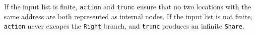 \documentclass[envcountsect]{llncs}
\begin{document}
If the input list is finite, {\tt action} and {\tt trunc} ensure that no two locations with the same address are both represented as internal nodes.
If the input list is not finite, {\tt action} never excapes the {\tt Right} branch, and {\tt trunc} produces an infinite {\tt Share}.

\begin{comment}
In the code above, the central detail is the function {\tt action}.
This function decom
Formally, Haskell datatypes are closer to coinductive types than inductive types, as the latter as forced to be 
To formalize and clarify the sharing, a cyclic Braun stream will be built with explicit sharing.
To ensure that the sharing is done correctly, we use {\tt iterate}.
The functino we pass to iterate must:
\begin{itemize}
\item Be aware of the cycle length $m$
\item Collect a list of pairs $\langle i,j \rangle$ representing the locations in $\mathbb{Z}_m \times \mathbb{Z}_m$ that already have locations in the stream associated with them
\item Calculate a new pair based only on stream location
\end{itemize}
An appropriate such function is in Figure 
It produces (and consumes) a triple consisting of the real location in the stream (0-indexed), the cycle length, and a partial function mapping pairs $\langle i,j \rangle$ to stream locations.
From these triples, the function {\tt truncateFinite} 
\begin{figure}
\begin{alltt}
data Share a = Branch a (Share a) (Share a)
             | Ref Integer
type Triple = (Integer,Integer,(Integer,Integer) -> Maybe Integer)
finiteCycleAction :: Triple -> Triple
finiteCycleAction (location,m,previous) =
  (location+1,m,
   let incrHere = incrementOf location m
       offsetHere = location `mod` m
   in case previous (incrHere, offsetHere) of
        Just _ -> previous
        Nothing -> 
          let current (incr, offs) =
                case (incr==incrHere, offs==offsetHere) of
                  (Eq,Eq) -> Just location
                  _ -> previous (incr, offs)
          in current)
floorlg2 :: Integer -> Integer
floorlg2 x = 
  case x `div` 2 of
    0 -> 0
    y -> 1 + floorlg2 y
incrementOf :: Integer -> Integer -> Integer
incrementOf location m =
  (2^(floorlg2 (1+location))) `mod` m
truncateFinite :: BS Triple -> BraunRef Integer
truncateFinite (BS (loc,m,prev) od ev) =
  let incrHere = incrementOf loc m

\end{comment}
\end{document}
